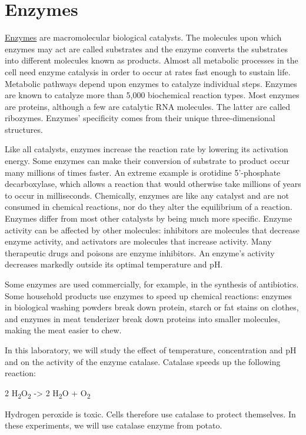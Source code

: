 \chapter{Enzymes}\label{enzymes}

\href{https://en.wikipedia.org/wiki/Enzyme}{Enzymes} are macromolecular
biological catalysts. The molecules upon which enzymes may act are
called substrates and the enzyme converts the substrates into different
molecules known as products. Almost all metabolic processes in the cell
need enzyme catalysis in order to occur at rates fast enough to sustain
life. Metabolic pathways depend upon enzymes to catalyze individual
steps. Enzymes are known to catalyze more than 5,000 biochemical
reaction types. Most enzymes are proteins, although a few are catalytic
RNA molecules. The latter are called ribozymes. Enzymes' specificity
comes from their unique three-dimensional structures.

Like all catalysts, enzymes increase the reaction rate by lowering its
activation energy. Some enzymes can make their conversion of substrate
to product occur many millions of times faster. An extreme example is
orotidine 5'-phosphate decarboxylase, which allows a reaction that would
otherwise take millions of years to occur in milliseconds. Chemically,
enzymes are like any catalyst and are not consumed in chemical
reactions, nor do they alter the equilibrium of a reaction. Enzymes
differ from most other catalysts by being much more specific. Enzyme
activity can be affected by other molecules: inhibitors are molecules
that decrease enzyme activity, and activators are molecules that
increase activity. Many therapeutic drugs and poisons are enzyme
inhibitors. An enzyme's activity decreases markedly outside its optimal
temperature and pH.

Some enzymes are used commercially, for example, in the synthesis of
antibiotics. Some household products use enzymes to speed up chemical
reactions: enzymes in biological washing powders break down protein,
starch or fat stains on clothes, and enzymes in meat tenderizer break
down proteins into smaller molecules, making the meat easier to chew.

In this laboratory, we will study the effect of temperature,
concentration and pH and on the activity of the enzyme catalase.
Catalase speeds up the following reaction:

2 H\textsubscript{2}O\textsubscript{2} -\textgreater{} 2
H\textsubscript{2}O + O\textsubscript{2}

Hydrogen peroxide is toxic. Cells therefore use catalase to protect
themselves. In these experiments, we will use catalase enzyme from
potato.

